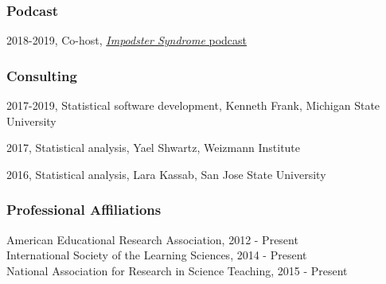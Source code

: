 \documentclass[
  14,
]{article}
\begin{document}
\hypertarget{podcast}{%
\subsubsection{Podcast}\label{podcast}}

2018-2019, Co-host,
\href{http://impodstersyndrome.libsyn.com/}{\emph{Impodster Syndrome}
podcast}

\hypertarget{consulting}{%
\subsubsection{Consulting}\label{consulting}}

2017-2019, Statistical software development, Kenneth Frank, Michigan
State University

2017, Statistical analysis, Yael Shwartz, Weizmann Institute

2016, Statistical analysis, Lara Kassab, San Jose State University

\hypertarget{professional-affiliations}{%
\subsubsection{Professional
Affiliations}\label{professional-affiliations}}

American Educational Research Association, 2012 - Present\\
International Society of the Learning Sciences, 2014 - Present\\
National Association for Research in Science Teaching, 2015 - Present
\end{document}
